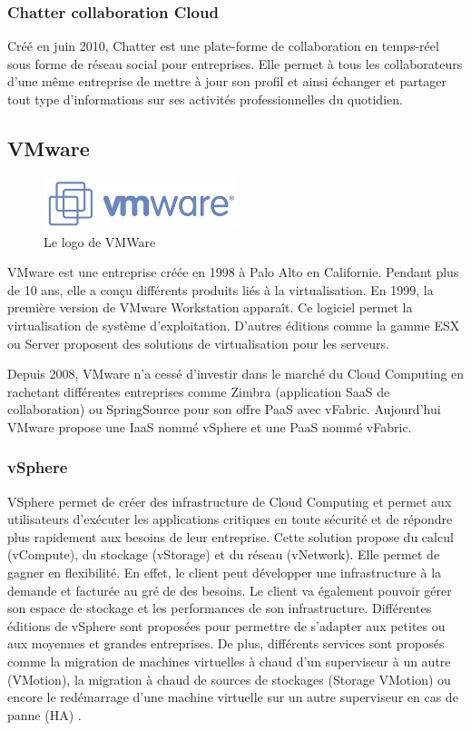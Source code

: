 \documentclass[a4paper,12pt]{report}
\begin{document}
\begin{onehalfspace}
	\subsubsection{Chatter collaboration Cloud}
Créé en juin 2010, Chatter est une plate-forme de collaboration en temps-réel sous forme de réseau social pour entreprises. Elle permet à tous les collaborateurs d’une même entreprise de mettre à jour son profil et ainsi échanger et partager tout type d’informations sur ses activités professionnelles du quotidien.
	

	\subsection{VMware}
		\begin{figure}
			\centering
			\includegraphics[width=0.5\textwidth]{vmware.jpeg} 
			\caption{Le logo de VMWare}
		\end{figure}
	VMware est une entreprise créée en 1998 à Palo Alto en Californie. Pendant plus de 10 ans, elle a conçu différents produits liés à la virtualisation. En 1999, la première version de VMware Workstation apparaît. Ce logiciel permet la virtualisation de système d’exploitation. D’autres éditions comme la gamme ESX ou Server proposent des solutions de virtualisation pour les serveurs.

	Depuis 2008, VMware n’a cessé d’investir dans le marché du Cloud Computing en rachetant différentes entreprises comme Zimbra (application SaaS de collaboration) ou SpringSource pour son offre PaaS avec vFabric. Aujourd’hui VMware propose une IaaS nommé vSphere et une PaaS nommé vFabric.
	\subsubsection*{vSphere}
	VSphere permet de créer des infrastructure de Cloud Computing et permet aux utilisateurs d'exécuter les applications critiques en toute sécurité et de répondre plus rapidement aux besoins de leur entreprise. Cette solution propose du calcul (vCompute), du stockage (vStorage) et du réseau (vNetwork). Elle permet de gagner en flexibilité. En effet, le client peut développer une infrastructure à la demande et facturée au gré de des besoins. Le client va également pouvoir gérer son espace de stockage et les performances de son infrastructure. Différentes éditions de vSphere sont proposées pour permettre de s’adapter aux petites ou aux moyennes et grandes entreprises. De plus, différents services sont proposés comme la migration de machines virtuelles à chaud d’un superviseur à un autre (VMotion), la migration à chaud de sources de stockages (Storage VMotion) ou encore le redémarrage d’une machine virtuelle sur un autre superviseur en cas de panne (HA) \cite{source:vsphere}.


\end{onehalfspace}
\end{document}
